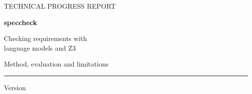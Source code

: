 \documentclass[11pt,a4paper]{article}
\begin{document}
\hypersetup{pageanchor=false}
\begin{titlepage}
\vspace*{15mm}
{\sffamily\color{Teal}\large TECHNICAL PROGRESS REPORT\par}
\vspace{8mm}
{\sffamily\bfseries\color{Ink}\fontsize{30}{35}\selectfont speccheck\par}
\vspace{4mm}
{\sffamily\color{Ink}\LARGE Checking requirements with\\language models and Z3\par}
\vspace{8mm}
{\large Method, evaluation and limitations\par}
\vspace{10mm}
\hrule
\vspace{5mm}

\vfill
{\color{Muted}\snapshotdate\quad\textbullet\quad Version \par}
\end{titlepage}
\hypersetup{pageanchor=true}
{\small\setlength{\parskip}{0pt}\tableofcontents}
\clearpage
{}







\clearpage


\clearpage
\appendix

\clearpage

\clearpage

\end{document}
